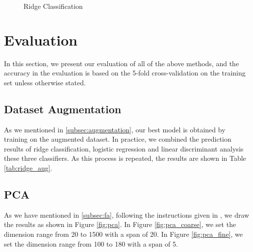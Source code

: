 \documentclass[10pt,journal,compsoc]{IEEEtran}
\begin{document}
\begin{figure}[!t]
{\begin{minipage}[t]{0.33\textwidth}
  \end{minipage}
  \label{fig:ridge_l2}
  }%
\caption{Ridge Classification}
\label{fig:ridge}
\end{figure}

\section{Evaluation}
\label{sec:evaluation}
In this section, we present our evaluation of all of the above methods, and the accuracy in the evaluation is based on the 5-fold cross-validation on the training set unless otherwise stated.

\subsection{Dataset Augmentation}
\label{subsec:dataset_aug}
As we mentioned in \ref{subsec:augmentation}, our best model is obtained by training on the augmented dataset. In practice, we combined the prediction results of ridge classification, logistic regression and linear discriminant analysis these three classifiers. As this process is repeated, the results are shown in Table \ref{tab:ridge_aug}.

\subsection{PCA}
\label{subsec:eva_pca}
As we have mentioned in \ref{subsec:fa}, following the instructions given in \cite{pcavsfa}, we draw the results as shown in Figure \ref{fig:pca}. In Figure \ref{fig:pca_coarse}, we set the dimension range from 20 to 1500 with a span of 20. In Figure \ref{fig:pca_fine}, we set the dimension range from 100 to 180 with a span of 5.
\end{document}
